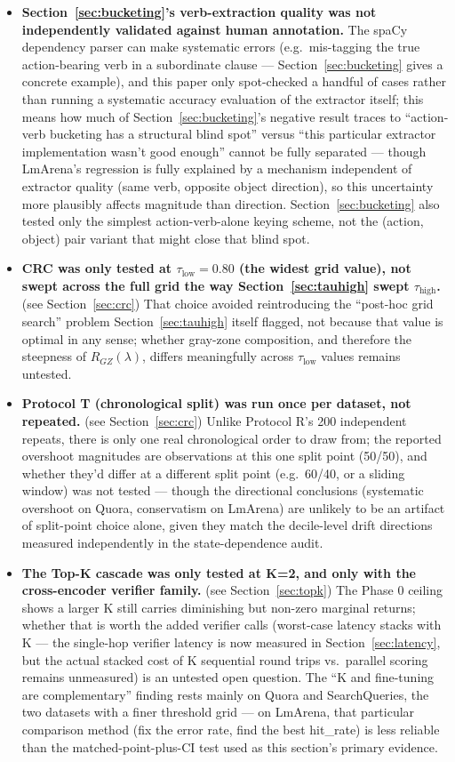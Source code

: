 \documentclass[11pt]{article}
\newcommand{\taulow}{\ensuremath{\tau_{\text{low}}}}
\newcommand{\tauhigh}{\ensuremath{\tau_{\text{high}}}}
\begin{document}
\begin{itemize}[leftmargin=*]
  \item \textbf{Section~\ref{sec:bucketing}'s verb-extraction quality was not independently validated against human annotation.} The spaCy dependency parser can make systematic errors (e.g.\ mis-tagging the true action-bearing verb in a subordinate clause --- Section~\ref{sec:bucketing} gives a concrete example), and this paper only spot-checked a handful of cases rather than running a systematic accuracy evaluation of the extractor itself; this means how much of Section~\ref{sec:bucketing}'s negative result traces to ``action-verb bucketing has a structural blind spot'' versus ``this particular extractor implementation wasn't good enough'' cannot be fully separated --- though LmArena's regression is fully explained by a mechanism independent of extractor quality (same verb, opposite object direction), so this uncertainty more plausibly affects magnitude than direction. Section~\ref{sec:bucketing} also tested only the simplest action-verb-alone keying scheme, not the (action, object) pair variant that might close that blind spot.
  \item \textbf{CRC was only tested at $\taulow=0.80$ (the widest grid value), not swept across the full grid the way Section~\ref{sec:tauhigh} swept $\tauhigh$.} (see Section~\ref{sec:crc}) That choice avoided reintroducing the ``post-hoc grid search'' problem Section~\ref{sec:tauhigh} itself flagged, not because that value is optimal in any sense; whether gray-zone composition, and therefore the steepness of $R_{GZ}(\lambda)$, differs meaningfully across $\taulow$ values remains untested.
  \item \textbf{Protocol T (chronological split) was run once per dataset, not repeated.} (see Section~\ref{sec:crc}) Unlike Protocol R's 200 independent repeats, there is only one real chronological order to draw from; the reported overshoot magnitudes are observations at this one split point (50/50), and whether they'd differ at a different split point (e.g.\ 60/40, or a sliding window) was not tested --- though the directional conclusions (systematic overshoot on Quora, conservatism on LmArena) are unlikely to be an artifact of split-point choice alone, given they match the decile-level drift directions measured independently in the state-dependence audit.
  \item \textbf{The Top-K cascade was only tested at K=2, and only with the cross-encoder verifier family.} (see Section~\ref{sec:topk}) The Phase 0 ceiling shows a larger K still carries diminishing but non-zero marginal returns; whether that is worth the added verifier calls (worst-case latency stacks with K --- the single-hop verifier latency is now measured in Section~\ref{sec:latency}, but the actual stacked cost of K sequential round trips vs.\ parallel scoring remains unmeasured) is an untested open question. The ``K and fine-tuning are complementary'' finding rests mainly on Quora and SearchQueries, the two datasets with a finer threshold grid --- on LmArena, that particular comparison method (fix the error rate, find the best hit\_rate) is less reliable than the matched-point-plus-CI test used as this section's primary evidence.

\end{itemize}
\end{document}
